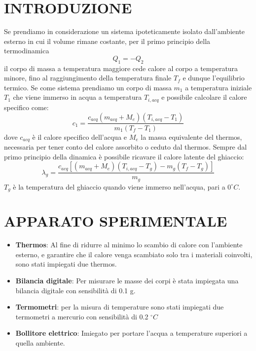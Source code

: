 \documentclass{article_saj}
\begin{document}
\section{INTRODUZIONE}
Se prendiamo in considerazione un sistema ipoteticamente isolato dall'ambiente esterno
in cui il volume rimane costante, per il primo principio della termodinamica 
\begin{equation}
     Q_1 = -Q_2
     \label{eq:1}
\end{equation}
il corpo di massa a temperatura maggiore cede calore al corpo a temperatura minore, fino al raggiungimento
della temperatura finale $T_f$ e dunque l'equilibrio termico. Se come sistema prendiamo un corpo
di massa $m_1$ a temperatura iniziale $T_1$ che viene immerso in acqua a temperatura $T_{i,acq}$
e possibile calcolare il calore specifico come:
\begin{equation}
     c_1 = \frac{c_{acq}(m_{acq} + M_e)(T_{i,acq} - T_1)}{m_1(T_f - T_1)}
     \label{eq:2}
\end{equation}
dove $c_{acq}$ è il calore specifico dell'acqua e $M_e$ la massa equivalente
del thermos, necessaria per tener conto del calore assorbito o ceduto dal thermos.
Sempre dal primo principio della dinamica è possibile ricavare il calore latente del ghiaccio:
\begin{equation}
     \lambda_g = \frac{c_{acq}[(m_{acq} + M_e)(T_{i,acq} - T_g) - m_g(T_f - T_g) ]}{m_g}
     \label{eq:3}
\end{equation}
$T_g$ è la temperatura del ghiaccio quando viene immerso nell'acqua, pari a $0^\circ C$.



\indent






\section{APPARATO SPERIMENTALE}
\begin{itemize}
     \item \textbf{Thermos}:
          Al fine di ridurre al minimo lo scambio di 
          calore con l'ambiente esterno, e garantire che il calore venga scambiato
          solo tra i materiali coinvolti, sono stati impiegati due thermos.
     \item \textbf{Bilancia digitale}:
          Per misurare le masse dei corpi è stata impiegata una bilancia 
          digitale con sensibilità di 0.1 g.
     \item \textbf{Termometri}:
          per la misura di temperature sono stati impiegati due
          termometri a mercurio con sensibilità di 0.2 $^\circ C$
     \item \textbf{Bollitore elettrico}:
          Imiegato per portare l'acqua a temperature superiori
          a quella ambiente.
 \end{itemize}
\indent
\end{document}
